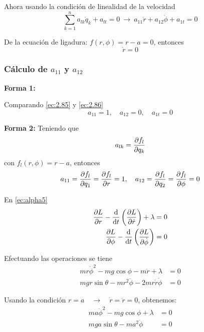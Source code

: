 \documentclass[../main]{subfiles}
\begin{document}
Ahora usando la condición de linealidad de la velocidad
\begin{equation}
    \sum_{k=1}^n a_{lk}\dot{q}_k+a_{lt}=0 \ \rightarrow \ a_{11}\dot{r}+a_{12}\dot{\phi}+a_{1t}=0
    \label{ec:2.85}
\end{equation}

De la ecuación de ligadura: $f(r, \phi)=r-a=0$, entonces
\begin{equation}
    \dot{r}=0
    \label{ec:2.86}
\end{equation}

\subsubsection*{Cálculo de $a_{11}$ y $a_{12}$}
\textbf{Forma 1:}

Comparando \eqref{ec:2.85} y \eqref{ec:2.86}
\begin{equation}
    a_{11}=1, \quad a_{12}=0, \quad a_{1t}=0
\end{equation}

\textbf{Forma 2:}
Teniendo que
\begin{equation}
    a_{lk}=\pdv{f_l}{q_k}
\end{equation}
con $f_l(r, \phi)=r-a$, entonces
\begin{equation}
    a_{11}=\pdv{f_l}{q_1}=\pdv{f_l}{r}=1, \quad a_{12}=\pdv{f_l}{q_2}=\pdv{f_l}{\phi}=0
\end{equation}

En \eqref{ec:alpha5}
\begin{equation}
    \begin{split}
        \pdv{L}{r}-\dv{}{t}\left(\pdv{L}{\dot{r}}\right)+\lambda&=0\\
        \pdv{L}{\phi}-\dv{}{t}\left(\pdv{L}{\dot{\phi}}\right)&=0
    \end{split}
\end{equation}

Efectuando las operaciones se tiene
\begin{equation}
    \begin{split}
        mr \dot{\phi}^2-mg \cos \phi-m\ddot{r}+\lambda&=0 \\
        mgr \sin \theta-mr^2 \ddot{\phi}-2mr\dot{r}\dot{\phi}&=0
    \end{split}
\end{equation}

Usando la condición $r=a \quad \rightarrow \quad \dot{r}=\ddot{r}=0$, obtenemos:
\begin{align}
    ma\dot{\phi}^2-mg\cos \phi+\lambda&=0 \label{ec:2.92}\\
    mg a \sin \theta-ma^2 \ddot{\phi}&=0 \label{ec:2.93}
\end{align}
\end{document}
